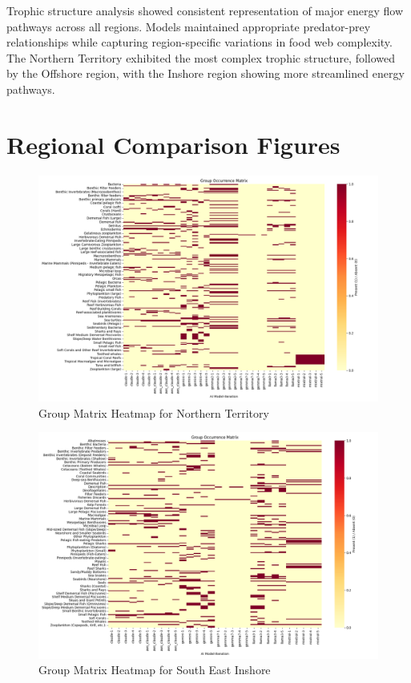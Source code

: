 Trophic structure analysis showed consistent representation of major energy flow pathways across all regions. Models maintained appropriate predator-prey relationships while capturing region-specific variations in food web complexity. The Northern Territory exhibited the most complex trophic structure, followed by the Offshore region, with the Inshore region showing more streamlined energy pathways.

\section{Regional Comparison Figures}
\begin{figure}[H]
    \centering
    \includegraphics[width=\textwidth]{../Validation/NorthernTerritory/reports/report_2024-12-11_16-58-03/group_matrix_heatmap.png}
    \caption{Group Matrix Heatmap for Northern Territory}
    \label{fig:nt_heatmap}
\end{figure}

\begin{figure}[H]
    \centering
    \includegraphics[width=\textwidth]{../Validation/SouthEastInshore/reports/report_2024-12-11_17-16-16/group_matrix_heatmap.png}
    \caption{Group Matrix Heatmap for South East Inshore}
    \label{fig:sei_heatmap}
\end{figure}


